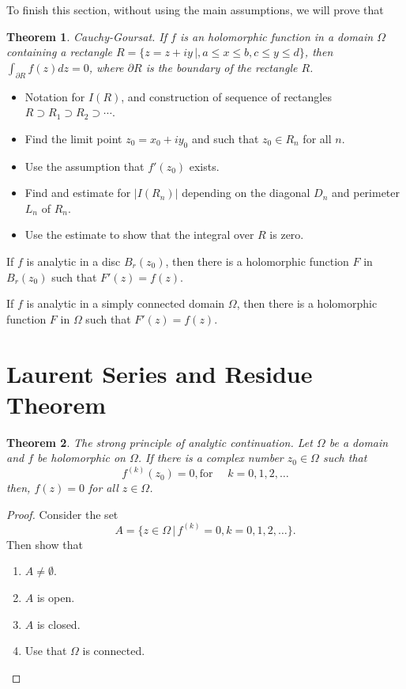 \documentclass{amsart}
\newtheorem{thm}{Theorem}
\begin{document}
To finish this section, without using the main assumptions, we will prove that 

\begin{thm}
\alert{Cauchy-Goursat}. If \(f\) is an holomorphic function in a domain \(\Omega\) containing a rectangle \(R = \{ z = z + iy \, | , a\leq x \leq b, c \leq y \leq d \}\), then \(\int_{\partial R} f(z) dz = 0\), where \(\partial R\) is the boundary of the rectangle \(R\).
\end{thm}

\begin{itemize}
\item Notation for \(I(R)\), and construction of sequence of rectangles \(R \supset R_1 \supset R_2 \supset \cdots\).
\item Find the limit point \(z_0 = x_0+ i y_0\) and such that \(z_0 \in R_{n}\) for all \(n\).
\item Use the assumption that \(f'(z_0)\) exists.
\item Find and estimate for \(|I(R_n)|\) depending on the diagonal \(D_n\) and perimeter \(L_n\) of \(R_n\).
\item Use the estimate to show that the integral over \(R\) is zero.
\end{itemize}

If \(f\) is analytic in a disc \(B_r(z_0)\), then there is a holomorphic function \(F\) in \(B_r(z_0)\) such that \(F'(z) = f(z)\).

If \(f\) is analytic in a simply connected domain \(\Omega\), then there is a holomorphic function \(F\) in \(\Omega\) such that \(F'(z) = f(z)\).



\section{Laurent Series and Residue Theorem}
\label{sec:org7815b72}

\begin{thm}
\alert{The strong principle of analytic continuation}. Let \(\Omega\) be a domain and \(f\) be holomorphic on \(\Omega\). If there is a complex number \(z_0\in\Omega\) such that
\[ f^{(k)}(z_0) = 0, \mbox{for }\quad k = 0,1,2,\ldots \]
then, \(f(z) = 0\) for all \(z\in \Omega\).
\end{thm}
\begin{proof}
Consider the set 
\[ A = \{ z \in \Omega \, | \, f^{(k)} = 0, k = 0,1,2,\ldots \}. \]
Then show that
\begin{enumerate}
\item \(A \neq \emptyset\).
\item \(A\) is open.
\item \(A\) is closed.
\item Use that \(\Omega\) is connected.
\end{enumerate}
\end{proof}
\end{document}
